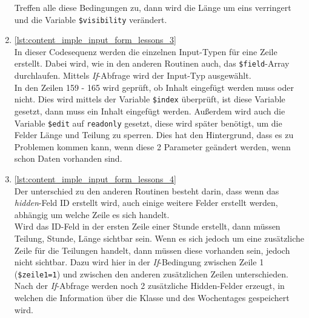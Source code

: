 \begin{enumerate}
	Treffen alle diese Bedingungen zu, dann wird die Länge um eins verringert und die Variable \texttt{\$visibility} verändert.\\
	
	
	
	\item \autoref{lst:content_imple_input_form_lessons_3}\\
	In dieser Codesequenz werden die einzelnen Input-Typen für eine Zeile erstellt. Dabei wird, wie in den anderen Routinen auch, das \texttt{\$field}-Array durchlaufen. Mittels \textit{If}-Abfrage wird der Input-Typ ausgewählt.\\
	In den Zeilen 159 - 165 wird geprüft, ob Inhalt eingefügt werden muss oder nicht. Dies wird mittels der Variable \texttt{\$index} überprüft, ist diese Variable gesetzt, dann muss ein Inhalt eingefügt werden. Außerdem wird auch die Variable \texttt{\$edit} auf \texttt{readonly} gesetzt, diese wird später benötigt, um die Felder Länge und Teilung zu sperren. Dies hat den Hintergrund, dass es zu Problemen kommen kann, wenn diese 2 Parameter geändert werden, wenn schon Daten vorhanden sind.\\
	
	
	
	\item \autoref{lst:content_imple_input_form_lessons_4}\\
	Der unterschied zu den anderen Routinen besteht darin, dass wenn das \textit{hidden}-Feld ID erstellt wird, auch einige weitere Felder erstellt werden, abhängig um welche Zeile es sich handelt.\\
	Wird das ID-Feld in der ersten Zeile einer Stunde erstellt, dann müssen Teilung, Stunde, Länge sichtbar sein. Wenn es sich jedoch um eine zusätzliche Zeile für die Teilungen handelt, dann müssen diese vorhanden sein, jedoch nicht sichtbar. Dazu wird hier in der \textit{If}-Bedingung zwischen Zeile 1 (\texttt{\$zeile1=1}) und zwischen den anderen zusätzlichen Zeilen unterschieden.\\
	Nach der \textit{If}-Abfrage werden noch 2 zusätzliche Hidden-Felder erzeugt, in welchen die Information über die Klasse und des Wochentages gespeichert wird.\\
	
	

\end{enumerate}
